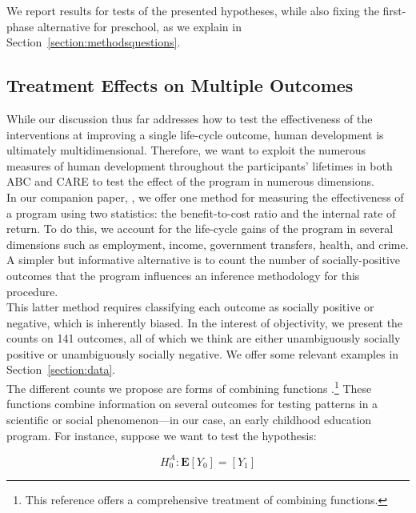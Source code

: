 \noindent We report results for tests of the presented hypotheses, while also fixing the first-phase alternative for preschool, as we explain in Section~\ref{section:methodsquestions}.

\subsection{Treatment Effects on Multiple Outcomes}

\noindent While our discussion thus far addresses how to test the effectiveness of the interventions at improving a single life-cycle outcome, human development is ultimately multidimensional. Therefore, we want to exploit the numerous measures of human development throughout the participants' lifetimes in both ABC and CARE to test the effect of the program in numerous dimensions. \\

\noindent In our companion paper, \citet{Elango_et_al_2015_ABC_unpublished}, we offer one method for measuring the effectiveness of a program using two statistics: the benefit-to-cost ratio and the internal rate of return. To do this, we account for the life-cycle gains of the program in several dimensions such as employment, income, government transfers, health, and crime. A simpler but informative alternative is to count the number of socially-positive outcomes that the program influences an inference methodology for this procedure.\\

\noindent This latter method requires classifying each outcome as socially positive or negative, which is inherently biased. In the interest of objectivity, we present the counts on 141 outcomes, all of which we think are either unambiguously socially positive or unambiguously socially negative. We offer some relevant examples in Section~\ref{section:data}.\\

\noindent The different counts we propose are forms of combining functions \citep{Pesarin_Salmaso_2010_PermutationTests}.\footnote{This reference offers a comprehensive treatment of combining functions.} These functions combine information on several outcomes for testing patterns in a scientific or social phenomenon---in our case, an early childhood education program. For instance, suppose we want to test the hypothesis: 

\begin{equation}
H_{0}^A: \mathbf{E} \left[ Y_{0} \right] =  \left[ Y_{1} \right] \label{eq:hoagain}
\end{equation}


